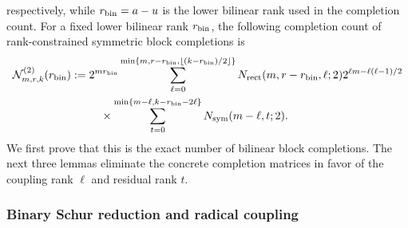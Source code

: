 \documentclass[11pt]{article}
\newcommand{\1}{\mathbf 1}
\theoremstyle{plain}
\theoremstyle{definition}
\theoremstyle{remark}
\begin{document}
respectively, while $r_{\rm bin}=a-u$ is the lower bilinear rank used in the
completion count.  For a fixed lower bilinear rank $r_{\rm bin}$, the following completion count of
rank-constrained symmetric block completions is
\begin{align}
 \mathcal N_{m,r,k}^{(2)}(r_{\rm bin})
 :={}&2^{m r_{\rm bin}}
 \sum_{\ell=0}^{\min\{m,r-r_{\rm bin},\lfloor(k-r_{\rm bin})/2\rfloor\}}
 N_{\rm rect}(m,r-r_{\rm bin},\ell;2)
 2^{\ell m-\ell(\ell-1)/2}\notag\\
 &\quad\times
 \sum_{t=0}^{\min\{m-\ell,k-r_{\rm bin}-2\ell\}}
 N_{\rm sym}(m-\ell,t;2).
 \label{eq:integrated-qubit-completion-count}
\end{align}
We first prove that this is the exact number of bilinear block completions.
The next three lemmas eliminate the concrete completion matrices in favor of
the coupling rank $\ell$ and residual rank $t$.

\subsubsection{Binary Schur reduction and radical coupling}
\label{subsubsec:binary-schur-radical-reduction}
\end{document}
